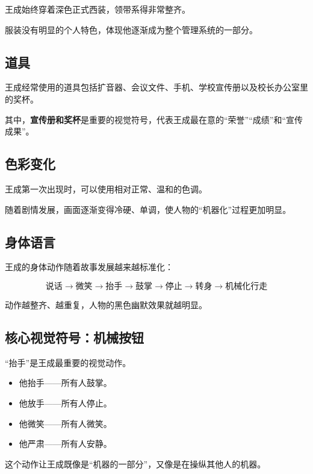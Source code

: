 \documentclass[12pt,a4paper]{ctexart}
\begin{document}
王成始终穿着深色正式西装，领带系得非常整齐。

服装没有明显的个人特色，体现他逐渐成为整个管理系统的一部分。

\subsection{道具}

王成经常使用的道具包括扩音器、会议文件、手机、学校宣传册以及校长办公室里的奖杯。

其中，\textbf{宣传册和奖杯}是重要的视觉符号，代表王成最在意的“荣誉”“成绩”和“宣传成果”。

\subsection{色彩变化}

王成第一次出现时，可以使用相对正常、温和的色调。

随着剧情发展，画面逐渐变得冷硬、单调，使人物的“机器化”过程更加明显。

\subsection{身体语言}

王成的身体动作随着故事发展越来越标准化：

\[
    \text{说话} \rightarrow \text{微笑} \rightarrow \text{抬手}
    \rightarrow \text{鼓掌} \rightarrow \text{停止} \rightarrow \text{转身}
    \rightarrow \text{机械化行走}
\]

动作越整齐、越重复，人物的黑色幽默效果就越明显。

\subsection{核心视觉符号：机械按钮}

“抬手”是王成最重要的视觉动作。

\begin{itemize}[leftmargin=2em]
    \item 他抬手——所有人鼓掌。
    \item 他放手——所有人停止。
    \item 他微笑——所有人微笑。
    \item 他严肃——所有人安静。
\end{itemize}

这个动作让王成既像是“机器的一部分”，又像是在操纵其他人的机器。

\end{document}
